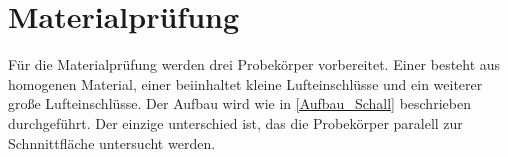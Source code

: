 \section{Materialprüfung}

Für die Materialprüfung werden drei Probekörper vorbereitet. Einer besteht aus homogenen Material, einer beiinhaltet kleine Lufteinschlüsse und ein weiterer große Lufteinschlüsse.
Der Aufbau wird wie in \autoref{Aufbau_Schall} beschrieben durchgeführt. Der einzige unterschied ist, das die Probekörper paralell zur Schnnittfläche untersucht werden.



